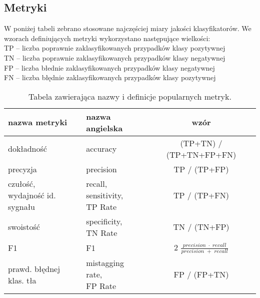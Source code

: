 \begin{appendices}
  \renewcommand\thetable{\thesection\arabic{table}}
  \renewcommand\thefigure{\thesection\arabic{figure}}
  \setcounter{table}{0}

\section{Metryki}
\label{sec:app:metryki}
W poniżej tabeli zebrano stosowane najczęściej miary jakości klasyfikatorów.
We wzorach definiujących metryki wykorzystano następujące wielkości:\\
TP  -- liczba poprawnie zaklasyfikowanych przypadków klasy pozytywnej\\
TN  -- liczba poprawnie zaklasyfikowanych przypadków klasy negatywnej\\
FP  -- liczba błednie zaklasyfikowanych przypadków klasy negatywnej\\
FN  -- liczba błędnie zaklasyfikowanych przypadków klasy pozytywnej\\


\begin{table}[ht]
\centering
\begin{tabular}{llc}
\toprule
nazwa metryki		& 	nazwa angielska				& 	wzór \\ 
\bottomrule
\toprule
dokładność			&	accuracy					& (TP+TN) / (TP+TN+FP+FN) \\ 
\midrule
precyzja			&	precision					& TP / (TP+FP) \\ 
\midrule
\pbox{0.3\textwidth}{czułość,\\ wydajność id. sygnału}				& 	\pbox{0.3\textwidth}{recall,\\ sensitivity,\\ TP Rate}	& TP / (TP+FN) \\ 
\midrule
swoistość			& 	\pbox{0.3\textwidth}{specificity,\\ TN Rate}			& TN / (TN+FP) \\ 
\midrule
F1					& 	F1							& 2 $\frac{precision\;\cdot\;recall}{precision\;+\;recall}$ \\ 
\midrule
prawd. błędnej klas. tła & \pbox{0.3\textwidth}{mistagging rate,\\ FP Rate}		& FP / (FP+TN) \\
\bottomrule
\end{tabular}
\caption{Tabela zawierająca nazwy i definicje popularnych metryk.}
\label{tab:metryki}
\end{table}


\end{appendices}
